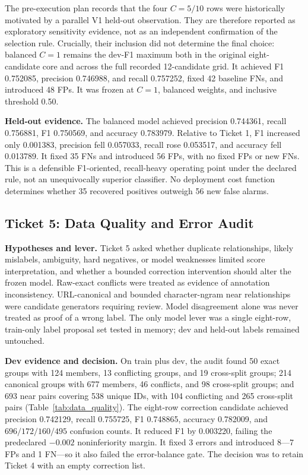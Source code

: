 \documentclass[conference]{IEEEtran}
\begin{document}
The pre-execution plan records that the four $C=5/10$ rows were historically motivated by a parallel V1 held-out observation. They are therefore reported as exploratory sensitivity evidence, not as an independent confirmation of the selection rule. Crucially, their inclusion did not determine the final choice: balanced $C=1$ remains the dev-F1 maximum both in the original eight-candidate core and across the full recorded 12-candidate grid. It achieved F1 0.752085, precision 0.746988, and recall 0.757252, fixed 42 baseline FNs, and introduced 48 FPs. It was frozen at $C=1$, balanced weights, and inclusive threshold 0.50.

\textbf{Held-out evidence.} The balanced model achieved precision 0.744361, recall 0.756881, F1 0.750569, and accuracy 0.783979. Relative to Ticket 1, F1 increased only 0.001383, precision fell 0.057033, recall rose 0.053517, and accuracy fell 0.013789. It fixed 35 FNs and introduced 56 FPs, with no fixed FPs or new FNs. This is a defensible F1-oriented, recall-heavy operating point under the declared rule, not an unequivocally superior classifier. No deployment cost function determines whether 35 recovered positives outweigh 56 new false alarms.

\subsection{Ticket 5: Data Quality and Error Audit}

\textbf{Hypotheses and lever.} Ticket 5 asked whether duplicate relationships, likely mislabels, ambiguity, hard negatives, or model weaknesses limited score interpretation, and whether a bounded correction intervention should alter the frozen model. Raw-exact conflicts were treated as evidence of annotation inconsistency. URL-canonical and bounded character-ngram near relationships were candidate generators requiring review. Model disagreement alone was never treated as proof of a wrong label. The only model lever was a single eight-row, train-only label proposal set tested in memory; dev and held-out labels remained untouched.



\textbf{Dev evidence and decision.} On train plus dev, the audit found 50 exact groups with 124 members, 13 conflicting groups, and 19 cross-split groups; 214 canonical groups with 677 members, 46 conflicts, and 98 cross-split groups; and 693 near pairs covering 538 unique IDs, with 104 conflicting and 265 cross-split pairs (Table~\ref{tab:data_quality}). The eight-row correction candidate achieved precision 0.742129, recall 0.755725, F1 0.748865, accuracy 0.782009, and $696/172/160/495$ confusion counts. It reduced F1 by 0.003220, failing the predeclared $-0.002$ noninferiority margin. It fixed 3 errors and introduced 8---7 FPs and 1 FN---so it also failed the error-balance gate. The decision was to retain Ticket 4 with an empty correction list.
\end{document}
